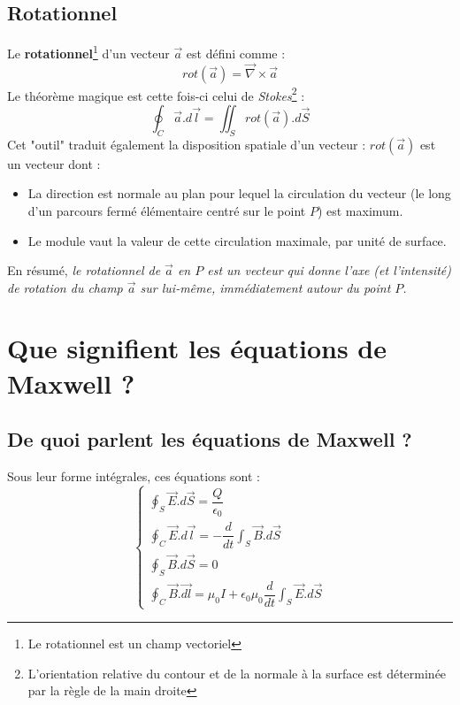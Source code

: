 \documentclass	[11pt, a4paper, openany]{book}
\begin{document}
\subsection{Rotationnel}
Le \textbf{rotationnel}\footnote{Le rotationnel est un champ vectoriel} d'un vecteur $\vec{a}$ est défini comme :
\begin{equation}
rot(\vec{a}) = \vec{\nabla} \times \vec{a}
\end{equation}
Le théorème magique est cette fois-ci celui de \textit{Stokes}\footnote{L'orientation relative du contour et de la normale à la surface est déterminée par la règle de la main droite} : 
\begin{equation}
\oint_C \vec{a}.d\vec{l} = \iint_S rot(\vec{a}).d\vec{S}
\end{equation}
Cet "outil" traduit également la disposition spatiale d'un vecteur : $rot(\vec{a})$ est un vecteur dont :
\begin{itemize}
\item La direction est normale au plan pour lequel la circulation du vecteur (le long d'un parcours fermé élémentaire centré sur le point $P$) est maximum.
\item Le module vaut la valeur de cette circulation maximale, par unité de surface.
\end{itemize}
En résumé, \textit{le rotationnel de $\vec{a}$ en $P$ est un vecteur qui donne l'axe (et l'intensité) de rotation du champ $\vec{a}$ sur lui-même, immédiatement autour du point $P$.}



\section{Que signifient les équations de Maxwell ?}
\subsection{De quoi parlent les équations de Maxwell ?}
Sous leur forme intégrales, ces équations sont :
\begin{equation}
\left\{\begin{array}{l}
\oint_S \vec{E}.d\vec{S} = \dfrac{Q}{\epsilon_0}\\
\oint_C \vec{E}.d\vec{l} = -\dfrac{d}{dt}\int_S \vec{B}.d\vec{S}\\
\oint_S \vec{B}.d\vec{S} = 0\\
\oint_C \vec{B}.\vec{dl} = \mu_0 I + \epsilon_0\mu_0\dfrac{d}{dt}\int_S \vec{E}.d\vec{S}
\end{array}\right.
\end{equation}
\end{document}
